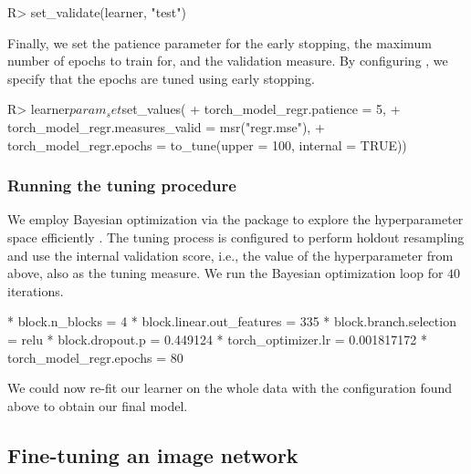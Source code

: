 \documentclass[article]{jss}
\theoremstyle{definition}
\begin{document}
\begin{CodeInput}
R> set_validate(learner, "test")
\end{CodeInput}

Finally, we set the patience parameter for the early stopping, the maximum number of epochs to train for, and the validation measure.
By configuring , we specify that the epochs are tuned using early stopping.

\begin{CodeInput}
R> learner$param_set$set_values(
+    torch_model_regr.patience = 5,
+    torch_model_regr.measures_valid = msr("regr.mse"),
+    torch_model_regr.epochs = to_tune(upper = 100, internal = TRUE))
\end{CodeInput}

\subsubsection{Running the tuning procedure}

We employ Bayesian optimization via the  package to explore the hyperparameter space efficiently \citep{ref-mlr3mbo}.
The tuning process is configured to perform holdout resampling and use the internal validation score, i.e., the value of the  hyperparameter from above, also as the tuning measure.
We run the Bayesian optimization loop for $40$ iterations.

\begin{CodeOutput}
* block.n_blocks = 4
* block.linear.out_features = 335
* block.branch.selection = relu
* block.dropout.p = 0.449124
* torch_optimizer.lr = 0.001817172
* torch_model_regr.epochs = 80
\end{CodeOutput}

We could now re-fit our learner on the whole data with the configuration found above to obtain our final model.

\subsection{Fine-tuning an image network}\label{sec:finetuning}
\end{document}
